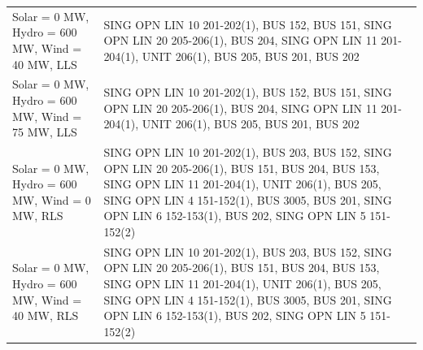 \documentclass[10pt]{report}
\begin{document}
\begin{table}[H]
{\begin{tabular}{lp{17cm}}
Solar = 0 MW, Hydro = 600 MW, Wind = 40 MW, LLS & SING OPN LIN   10 201-202(1), BUS 152, BUS 151, SING OPN LIN   20 205-206(1), BUS 204, SING OPN LIN   11 201-204(1), UNIT 206(1), BUS 205, BUS 201, BUS 202 \\
Solar = 0 MW, Hydro = 600 MW, Wind = 75 MW, LLS & SING OPN LIN   10 201-202(1), BUS 152, BUS 151, SING OPN LIN   20 205-206(1), BUS 204, SING OPN LIN   11 201-204(1), UNIT 206(1), BUS 205, BUS 201, BUS 202 \\
Solar = 0 MW, Hydro = 600 MW, Wind = 0 MW, RLS & SING OPN LIN   10 201-202(1), BUS 203, BUS 152, SING OPN LIN   20 205-206(1), BUS 151, BUS 204, BUS 153, SING OPN LIN   11 201-204(1), UNIT 206(1), BUS 205, SING OPN LIN   4 151-152(1), BUS 3005, BUS 201, SING OPN LIN   6 152-153(1), BUS 202, SING OPN LIN   5 151-152(2) \\
Solar = 0 MW, Hydro = 600 MW, Wind = 40 MW, RLS & SING OPN LIN   10 201-202(1), BUS 203, BUS 152, SING OPN LIN   20 205-206(1), BUS 151, BUS 204, BUS 153, SING OPN LIN   11 201-204(1), UNIT 206(1), BUS 205, SING OPN LIN   4 151-152(1), BUS 3005, BUS 201, SING OPN LIN   6 152-153(1), BUS 202, SING OPN LIN   5 151-152(2) \\

\bottomrule
\end{tabular}}
\end{table}
\end{document}
